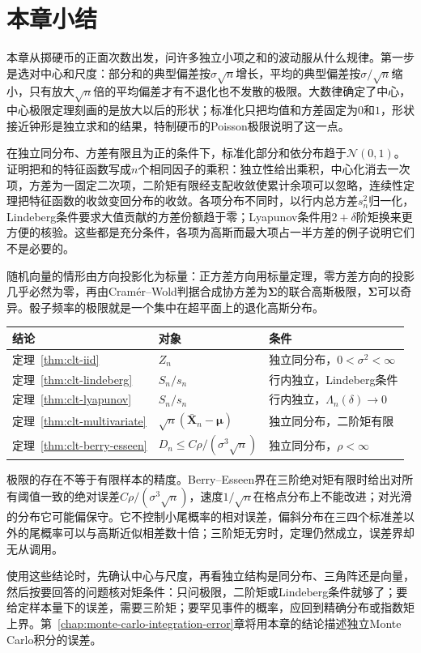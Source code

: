 \section{本章小结}
\label{sec:clt-summary}

本章从掷硬币的正面次数出发，问许多独立小项之和的波动服从什么规律。第一步是选对中心和尺度：部分和的典型偏差按$\sigma\sqrt{n}$增长，平均的典型偏差按$\sigma/\sqrt{n}$缩小，只有放大$\sqrt{n}$倍的平均偏差才有不退化也不发散的极限。大数律确定了中心，中心极限定理刻画的是放大以后的形状；标准化只把均值和方差固定为$0$和$1$，形状接近钟形是独立求和的结果，特制硬币的Poisson极限说明了这一点。

在独立同分布、方差有限且为正的条件下，标准化部分和依分布趋于$\mathcal{N}(0,1)$。证明把和的特征函数写成$n$个相同因子的乘积：独立性给出乘积，中心化消去一次项，方差为一固定二次项，二阶矩有限经支配收敛使累计余项可以忽略，连续性定理把特征函数的收敛变回分布的收敛。各项分布不同时，以行内总方差$s_n^2$归一化，Lindeberg条件要求大值贡献的方差份额趋于零；Lyapunov条件用$2+\delta$阶矩换来更方便的核验。这些都是充分条件，各项为高斯而最大项占一半方差的例子说明它们不是必要的。

随机向量的情形由方向投影化为标量：正方差方向用标量定理，零方差方向的投影几乎必然为零，再由Cramér--Wold判据合成协方差为$\bm{\Sigma}$的联合高斯极限，$\bm{\Sigma}$可以奇异。骰子频率的极限就是一个集中在超平面上的退化高斯分布。

\begin{BookInlineTable}
 \centering
 \caption{本章的高斯极限与误差界}
 \label{tab:clt-summary}
 \begin{tabular}{lll}
 \toprule
 结论 & 对象 & 条件 \\
 \midrule
 定理~\ref{thm:clt-iid} & $Z_n$ & 独立同分布，$0<\sigma^2<\infty$ \\
 定理~\ref{thm:clt-lindeberg} & $S_n/s_n$ & 行内独立，Lindeberg条件 \\
 定理~\ref{thm:clt-lyapunov} & $S_n/s_n$ & 行内独立，$\Lambda_n(\delta)\to0$ \\
 定理~\ref{thm:clt-multivariate} & $\sqrt{n}(\bar{\bm{X}}_n-\bm{\mu})$ & 独立同分布，二阶矩有限 \\
 定理~\ref{thm:clt-berry-esseen} & $D_n\leq C\rho/(\sigma^3\sqrt{n})$ & 独立同分布，$\rho<\infty$ \\
 \bottomrule
 \end{tabular}
\end{BookInlineTable}

极限的存在不等于有限样本的精度。Berry--Esseen界在三阶绝对矩有限时给出对所有阈值一致的绝对误差$C\rho/(\sigma^3\sqrt{n})$，速度$1/\sqrt{n}$在格点分布上不能改进；对光滑的分布它可能偏保守。它不控制小尾概率的相对误差，偏斜分布在三四个标准差以外的尾概率可以与高斯近似相差数十倍；三阶矩无穷时，定理仍然成立，误差界却无从调用。

使用这些结论时，先确认中心与尺度，再看独立结构是同分布、三角阵还是向量，然后按要回答的问题核对矩条件：只问极限，二阶矩或Lindeberg条件就够了；要给定样本量下的误差，需要三阶矩；要罕见事件的概率，应回到精确分布或指数矩上界。第~\ref{chap:monte-carlo-integration-error}章将用本章的结论描述独立Monte Carlo积分的误差。
